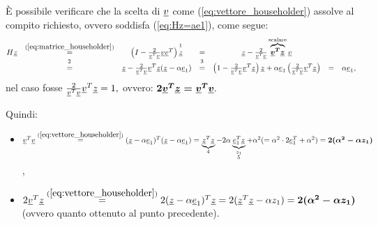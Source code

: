 È possibile verificare che la scelta di $\uline v$ come (\ref{eq:vettore_householder}) assolve al compito richiesto, ovvero soddisfa (\ref{eq:Hz=ae1}), come segue:
\begin{equation*}
    \begin{matrix}
        H\uline z &\overset{(\ref{eq:matrice_householder})}{=}&\left(I-\frac{2}{\uline v^T\uline v}\uline v\uline v^T\right)\overset{\footnotemark}{\uline z}&=&\uline z - \frac{2}{\uline v^T\uline v}\overbrace{\boldsymbol{\uline v^T\uline z}}^{\text{scalare}}\uline v\\
        &\overset{\footnotemark}{=}& \uline z - \frac{2}{\uline v^T\uline v}\uline v^T\uline z(\uline z - \alpha \uline e_1) &\overset{\footnotemark}{=}& \left(1 - \frac{2}{\uline v^T\uline v}\uline v^T\uline z \right)\uline z + \alpha \uline e_1\left(\frac{2}{\uline v^T\uline v}\uline v^T\uline z\right) &=& \alpha\uline e_1,
    \end{matrix}
\end{equation*}
nel caso fosse $\frac{2}{\uline v^T\uline v}\uline v^T\uline z=1,$ ovvero: $\boldsymbol{ 2\uline v^T\uline z = \uline v^T\uline v}.$

\addtocounter{footnote}{-2}



Quindi:
\begin{itemize}
    \item $\uline v^T\uline v \overset{(\ref{eq:vettore_householder})}{=}(\uline z -\alpha\uline e_1)^T(\uline z -\alpha\uline e_1)=\underbrace{\uline z^T\uline z}_{\footnotemark}-2\alpha\underbrace{\uline e_1^T\uline z}_{\underset{\footnotemark}{z_1}}+\alpha^2(=\alpha^2\cdot 2\uline e_1^T+\alpha^2)=\boldsymbol{2(\alpha^2-\alpha z_1)}$,
    \item $2\uline v^T\uline z\overset{(\ref{eq:vettore_householder})}{=} 2(\uline z - \alpha\uline e_1)^T\uline z = 2(\uline z^T \uline z - \alpha z_1) = \boldsymbol{2(\alpha^2-\alpha z_1)}$ (ovvero quanto ottenuto al punto precedente).
\end{itemize}

\addtocounter{footnote}{-1}


